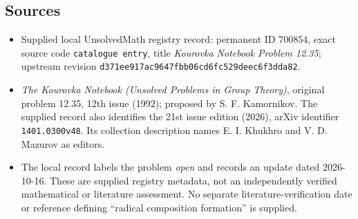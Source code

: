 \documentclass[11pt]{article}
\begin{document}
\subsection{Sources}
\begin{itemize}
\item Supplied local UnsolvedMath registry record: permanent ID \(700854\), exact source code \texttt{catalogue entry}, title \emph{Kourovka Notebook Problem 12.35}; upstream revision \texttt{d371ee917ac9647fbb06cd6fc529deec6f3dda82}.
\item \emph{The Kourovka Notebook (Unsolved Problems in Group Theory)}, original problem 12.35, 12th issue (1992); proposed by S. F. Kamornikov. The supplied record also identifies the 21st issue edition (2026), arXiv identifier \texttt{1401.0300v48}. Its collection description names E. I. Khukhro and V. D. Mazurov as editors.
\item The local record labels the problem \emph{open} and records an update dated 2026-10-16. These are supplied registry metadata, not an independently verified mathematical or literature assessment. No separate literature-verification date or reference defining ``radical composition formation'' is supplied.
\end{itemize}
\end{document}
